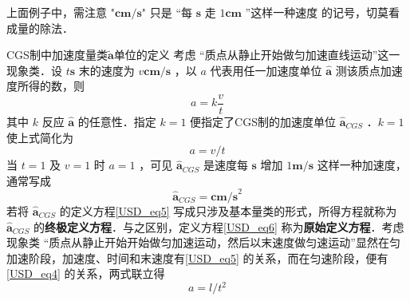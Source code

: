 上面例子中，需注意 "$\boldsymbol{cm/s}$" 只是 “每 $\boldsymbol{s}$ 走 $1\boldsymbol{cm}$ ”这样一种速度 的记号，切莫看成量的除法．
\begin{example}{CGS制中加速度量类$\tilde{\boldsymbol{a}}$单位的定义}
考虑 “质点从静止开始做匀加速直线运动”这一现象类．设 $t\boldsymbol{s}$ 末的速度为 $v\boldsymbol{cm/s}$ ，以 $a$ 代表用任一加速度单位 $\hat{\boldsymbol{a}}$ 测该质点加速度所得的数，则
\begin{equation}\label{USD_eq6}
a=k\frac{v}{t}
\end{equation}
其中 $k$ 反应 $\hat{\boldsymbol{a}}$ 的任意性．指定 $k=1$ 便指定了CGS制的加速度单位 $\hat{\boldsymbol{a}}_{CGS}$ ．$k=1$ 使上式简化为
\begin{equation}\label{USD_eq5}
a=v/t
\end{equation}
当 $t=1$ 及 $v=1$ 时 $a=1$ ，可见 $\hat{\boldsymbol{a}}_{CGS}$ 是速度每 $\boldsymbol{s}$ 增加 $1\boldsymbol{m/s}$ 这样一种加速度，通常写成
\begin{equation}
\hat{\boldsymbol{a}}_{CGS}=\boldsymbol{cm/s}^2
\end{equation}
若将 $\hat{\boldsymbol{a}}_{CGS}$ 的定义方程\autoref{USD_eq5} 写成只涉及基本量类的形式，所得方程就称为  $\hat{\boldsymbol{a}}_{CGS}$ 的\textbf{终极定义方程}．与之区别，定义方程\autoref{USD_eq6} 称为\textbf{原始定义方程}．考虑现象类 “质点从静止开始开始做匀加速运动，然后以末速度做匀速运动”显然在匀加速阶段，加速度、时间和末速度有\autoref{USD_eq5} 的关系，而在匀速阶段，便有\autoref{USD_eq4} 的关系，两式联立得
\begin{equation}
a=l/t^2
\end{equation}

\end{example}